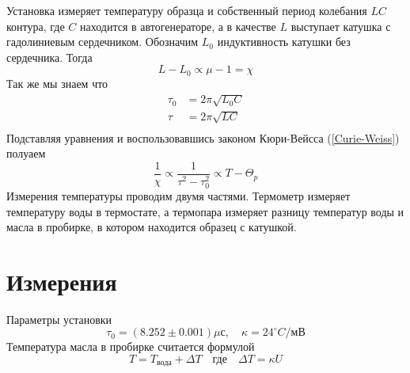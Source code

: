 \documentclass{article}
\begin{document}
Установка измеряет температуру образца и собственный период колебания $LC$ контура, 
где $C$ находится в автогенераторе, а в качестве $L$ выступает катушка с гадолиниевым 
сердечником. Обозначим $L_0$ индуктивность катушки без сердечника. Тогда
\begin{equation*}
    L - L_0 \propto \mu - 1 = \chi
\end{equation*}
Так же мы знаем что
\begin{align*}
    \tau_0 &= 2\pi\sqrt{L_0C} \\
    \tau &= 2\pi\sqrt{LC} \\
\end{align*}
Подставляя уравнения и воспользовавшись законом Кюри-Вейсса (\ref{Curie-Weiss}) полуаем
\begin{equation}
    \frac{1}{\chi} \propto \frac{1}{\tau^2 - \tau_0^2} \propto T - \Theta_p
\end{equation}
Измерения температуры проводим двумя частями. Термометр измеряет температуру воды в 
термостате, а термопара измеряет разницу температур воды и масла в пробирке, в котором находится образец с катушкой. 

\section{Измерения}
Параметры установки
\begin{equation*}
    \tau_0 = (8.252 \pm 0.001) \mu с \mathrm{,}\quad \kappa = 24^\circ C/мВ
\end{equation*}
Температура масла в пробирке считается формулой
\begin{equation*}
    T = T_{вода} + \Delta T \quad \text{где} \quad \Delta T = \kappa U
\end{equation*}
\end{document}
